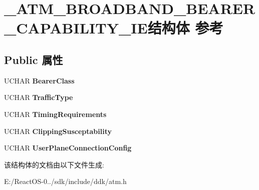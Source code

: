 \hypertarget{struct___a_t_m___b_r_o_a_d_b_a_n_d___b_e_a_r_e_r___c_a_p_a_b_i_l_i_t_y___i_e}{}\section{\+\_\+\+A\+T\+M\+\_\+\+B\+R\+O\+A\+D\+B\+A\+N\+D\+\_\+\+B\+E\+A\+R\+E\+R\+\_\+\+C\+A\+P\+A\+B\+I\+L\+I\+T\+Y\+\_\+\+I\+E结构体 参考}
\label{struct___a_t_m___b_r_o_a_d_b_a_n_d___b_e_a_r_e_r___c_a_p_a_b_i_l_i_t_y___i_e}
\subsection*{Public 属性}
\begin{DoxyCompactItemize}
\item 
\mbox{\label{struct___a_t_m___b_r_o_a_d_b_a_n_d___b_e_a_r_e_r___c_a_p_a_b_i_l_i_t_y___i_e_a37636b135b82febb2c044115ef6c04b0}} 
U\+C\+H\+AR {\bfseries Bearer\+Class}
\item 
\mbox{\label{struct___a_t_m___b_r_o_a_d_b_a_n_d___b_e_a_r_e_r___c_a_p_a_b_i_l_i_t_y___i_e_a42283a2e184c280ef22a78ccb54b7431}} 
U\+C\+H\+AR {\bfseries Traffic\+Type}
\item 
\mbox{\label{struct___a_t_m___b_r_o_a_d_b_a_n_d___b_e_a_r_e_r___c_a_p_a_b_i_l_i_t_y___i_e_ac90cc2891143e01665299eed26bd1913}} 
U\+C\+H\+AR {\bfseries Timing\+Requirements}
\item 
\mbox{\label{struct___a_t_m___b_r_o_a_d_b_a_n_d___b_e_a_r_e_r___c_a_p_a_b_i_l_i_t_y___i_e_a05c3a9f8cf780bbfeaea114536325614}} 
U\+C\+H\+AR {\bfseries Clipping\+Susceptability}
\item 
\mbox{\label{struct___a_t_m___b_r_o_a_d_b_a_n_d___b_e_a_r_e_r___c_a_p_a_b_i_l_i_t_y___i_e_ae873a6078b71704ca704c7f96268bb1e}} 
U\+C\+H\+AR {\bfseries User\+Plane\+Connection\+Config}
\end{DoxyCompactItemize}


该结构体的文档由以下文件生成\+:\begin{DoxyCompactItemize}
\item 
E\+:/\+React\+O\+S-\/0../sdk/include/ddk/atm.\+h\end{DoxyCompactItemize}
